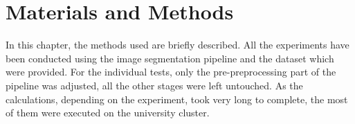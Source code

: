 \documentclass[journal]{IEEEtran}
\begin{document}
%




\section{Materials and Methods}
In this chapter, the methods used are briefly described. All the experiments have been conducted using the image segmentation pipeline and the dataset which were provided. For the individual tests, only the pre-preprocessing part of the pipeline was adjusted, all the other stages were left untouched. As the calculations, depending on the experiment, took very long to complete, the most of them were executed on the university cluster.
\end{document}
